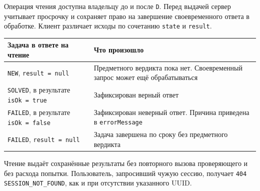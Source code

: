 \documentclass[12pt,a4paper]{article}
\begin{document}
Операция чтения доступна владельцу до и после \texttt{D}. Перед выдачей сервер учитывает просрочку и сохраняет право на завершение своевременного ответа в обработке. Клиент различает исходы по сочетанию \texttt{state} и \texttt{result}.

{\def\LTcaptype{none} %
\begin{longtable}[]{@{}
  >{\raggedright\arraybackslash}p{}
  >{\raggedright\arraybackslash}p{}@{}}
\toprule\noalign{}
\begin{minipage}[b]{\linewidth}\raggedright
Задача в ответе на чтение
\end{minipage} & \begin{minipage}[b]{\linewidth}\raggedright
Что произошло
\end{minipage} \\
\midrule\noalign{}
\endhead
\bottomrule\noalign{}
\endlastfoot
\texttt{NEW}, \texttt{result\ =\ null} & Предметного вердикта пока нет. Своевременный запрос может ещё обрабатываться \\
\texttt{SOLVED}, в результате \texttt{isOk\ =\ true} & Зафиксирован верный ответ \\
\texttt{FAILED}, в результате \texttt{isOk\ =\ false} & Зафиксирован неверный ответ. Причина приведена в \texttt{errorMessage} \\
\texttt{FAILED}, \texttt{result\ =\ null} & Задача завершена по сроку без предметного вердикта \\
\end{longtable}
}

Чтение выдаёт сохранённые результаты без повторного вызова проверяющего и без расхода попытки. Пользователь, запросивший чужую сессию, получает \texttt{404 SESSION\_\allowbreak{}NOT\_\allowbreak{}FOUND}, как и при отсутствии указанного UUID.
\end{document}
